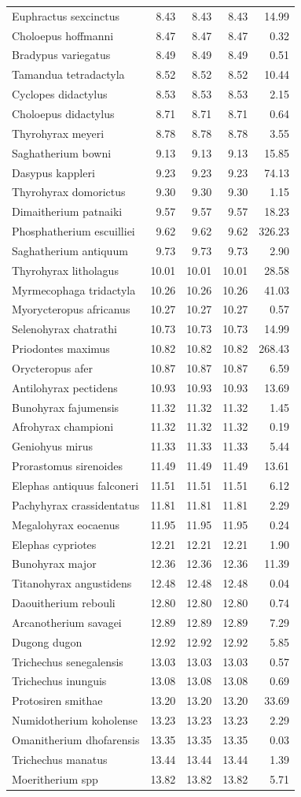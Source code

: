 \documentclass[10pt,letterpaper]{article}
\begin{document}
\begin{longtable}[]{@{}lrrrr@{}}
Euphractus sexcinctus & 8.43 & 8.43 & 8.43 & 14.99\tabularnewline
Choloepus hoffmanni & 8.47 & 8.47 & 8.47 & 0.32\tabularnewline
Bradypus variegatus & 8.49 & 8.49 & 8.49 & 0.51\tabularnewline
Tamandua tetradactyla & 8.52 & 8.52 & 8.52 & 10.44\tabularnewline
Cyclopes didactylus & 8.53 & 8.53 & 8.53 & 2.15\tabularnewline
Choloepus didactylus & 8.71 & 8.71 & 8.71 & 0.64\tabularnewline
Thyrohyrax meyeri & 8.78 & 8.78 & 8.78 & 3.55\tabularnewline
Saghatherium bowni & 9.13 & 9.13 & 9.13 & 15.85\tabularnewline
Dasypus kappleri & 9.23 & 9.23 & 9.23 & 74.13\tabularnewline
Thyrohyrax domorictus & 9.30 & 9.30 & 9.30 & 1.15\tabularnewline
Dimaitherium patnaiki & 9.57 & 9.57 & 9.57 & 18.23\tabularnewline
Phosphatherium escuilliei & 9.62 & 9.62 & 9.62 & 326.23\tabularnewline
Saghatherium antiquum & 9.73 & 9.73 & 9.73 & 2.90\tabularnewline
Thyrohyrax litholagus & 10.01 & 10.01 & 10.01 & 28.58\tabularnewline
Myrmecophaga tridactyla & 10.26 & 10.26 & 10.26 & 41.03\tabularnewline
Myorycteropus africanus & 10.27 & 10.27 & 10.27 & 0.57\tabularnewline
Selenohyrax chatrathi & 10.73 & 10.73 & 10.73 & 14.99\tabularnewline
Priodontes maximus & 10.82 & 10.82 & 10.82 & 268.43\tabularnewline
Orycteropus afer & 10.87 & 10.87 & 10.87 & 6.59\tabularnewline
Antilohyrax pectidens & 10.93 & 10.93 & 10.93 & 13.69\tabularnewline
Bunohyrax fajumensis & 11.32 & 11.32 & 11.32 & 1.45\tabularnewline
Afrohyrax championi & 11.32 & 11.32 & 11.32 & 0.19\tabularnewline
Geniohyus mirus & 11.33 & 11.33 & 11.33 & 5.44\tabularnewline
Prorastomus sirenoides & 11.49 & 11.49 & 11.49 & 13.61\tabularnewline
Elephas antiquus falconeri & 11.51 & 11.51 & 11.51 & 6.12\tabularnewline
Pachyhyrax crassidentatus & 11.81 & 11.81 & 11.81 & 2.29\tabularnewline
Megalohyrax eocaenus & 11.95 & 11.95 & 11.95 & 0.24\tabularnewline
Elephas cypriotes & 12.21 & 12.21 & 12.21 & 1.90\tabularnewline
Bunohyrax major & 12.36 & 12.36 & 12.36 & 11.39\tabularnewline
Titanohyrax angustidens & 12.48 & 12.48 & 12.48 & 0.04\tabularnewline
Daouitherium rebouli & 12.80 & 12.80 & 12.80 & 0.74\tabularnewline
Arcanotherium savagei & 12.89 & 12.89 & 12.89 & 7.29\tabularnewline
Dugong dugon & 12.92 & 12.92 & 12.92 & 5.85\tabularnewline
Trichechus senegalensis & 13.03 & 13.03 & 13.03 & 0.57\tabularnewline
Trichechus inunguis & 13.08 & 13.08 & 13.08 & 0.69\tabularnewline
Protosiren smithae & 13.20 & 13.20 & 13.20 & 33.69\tabularnewline
Numidotherium koholense & 13.23 & 13.23 & 13.23 & 2.29\tabularnewline
Omanitherium dhofarensis & 13.35 & 13.35 & 13.35 & 0.03\tabularnewline
Trichechus manatus & 13.44 & 13.44 & 13.44 & 1.39\tabularnewline
Moeritherium spp & 13.82 & 13.82 & 13.82 & 5.71\tabularnewline

\end{longtable}
\end{document}
